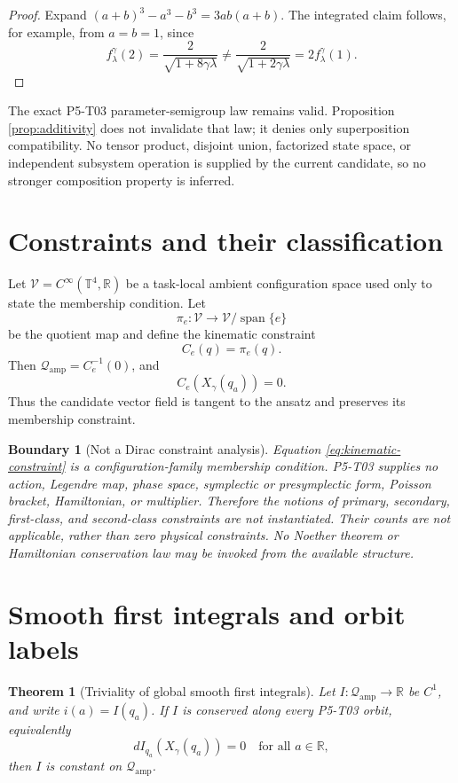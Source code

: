 \documentclass[11pt]{article}
\newcommand{\Qamp}{\mathcal Q_{\mathrm{amp}}}
\newtheorem{theorem}{Theorem}
\newtheorem{boundary}{Boundary}
\begin{document}
\begin{proof}
Expand \((a+b)^3-a^3-b^3=3ab(a+b)\).  The integrated claim follows, for
example, from \(a=b=1\), since
\[
 f^\gamma_\lambda(2)
 =\frac{2}{\sqrt{1+8\gamma\lambda}}
 \neq
 \frac{2}{\sqrt{1+2\gamma\lambda}}
 =2f^\gamma_\lambda(1).
\]
\end{proof}

The exact P5-T03 parameter-semigroup law remains valid.  Proposition
\ref{prop:additivity} does not invalidate that law; it denies only
superposition compatibility.  No tensor product, disjoint union, factorized
state space, or independent subsystem operation is supplied by the current
candidate, so no stronger composition property is inferred.

\section{Constraints and their classification}

Let \(\mathcal V=C^\infty(\mathbb T^4,\mathbb R)\) be a task-local ambient
configuration space used only to state the membership condition.  Let
\[
 \pi_e:\mathcal V\longrightarrow\mathcal V/\operatorname{span}\{e\}
\]
be the quotient map and define the kinematic constraint
\[
 C_e(q)=\pi_e(q).
 \label{eq:kinematic-constraint}
\]
Then \(\Qamp=C_e^{-1}(0)\), and
\[
 C_e(X_\gamma(q_a))=0.
\]
Thus the candidate vector field is tangent to the ansatz and preserves its
membership constraint.

\begin{boundary}[Not a Dirac constraint analysis]
Equation \eqref{eq:kinematic-constraint} is a configuration-family membership
condition.  P5-T03 supplies no action, Legendre map, phase space, symplectic or
presymplectic form, Poisson bracket, Hamiltonian, or multiplier.  Therefore
the notions of primary, secondary, first-class, and second-class constraints
are not instantiated.  Their counts are \emph{not applicable}, rather than
zero physical constraints.  No Noether theorem or Hamiltonian conservation
law may be invoked from the available structure.
\end{boundary}

\section{Smooth first integrals and orbit labels}

\begin{theorem}[Triviality of global smooth first integrals]
\label{thm:first-integrals}
Let \(I:\Qamp\to\mathbb R\) be \(C^1\), and write \(i(a)=I(q_a)\).  If \(I\)
is conserved along every P5-T03 orbit, equivalently
\[
 dI_{q_a}\!\left(X_\gamma(q_a)\right)=0
 \quad\text{for all }a\in\mathbb R,
\]
then \(I\) is constant on \(\Qamp\).
\end{theorem}
\end{document}
